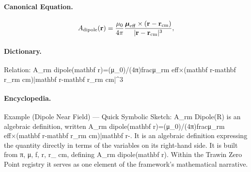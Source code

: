 \paragraph{Canonical Equation.}
\[
A_{\rm dipole}(\mathbf r)=\frac{\mu_0}{4\pi}\frac{\boldsymbol{\mu}_{\rm eff}\times(\mathbf r-\mathbf r_{\rm cm})}{|\mathbf r-\mathbf r_{\rm cm}|^3},
\]

\paragraph{Dictionary.}
Relation: A\_rm dipole(mathbf r)=(μ\_0)/(4π)fracμ\_rm eff×(mathbf r-mathbf r\_rm cm)|mathbf r-mathbf r\_rm cm|\textasciicircum{}3

\paragraph{Encyclopedia.}
Example (Dipole Near Field) — Quick Symbolic Sketch: A\_rm Dipole(R) is an algebraic definition, written A\_rm dipole(mathbf r)=(μ\_0)/(4π)fracμ\_rm eff×(mathbf r-mathbf r\_rm cm)|mathbf r-. It is an algebraic definition expressing the quantity directly in terms of the variables on its right-hand side. It is built from π, μ, f, r, r\_ cm, defining A\_rm dipole(mathbf r). Within the Trawin Zero Point registry it serves as one element of the framework's mathematical narrative.
